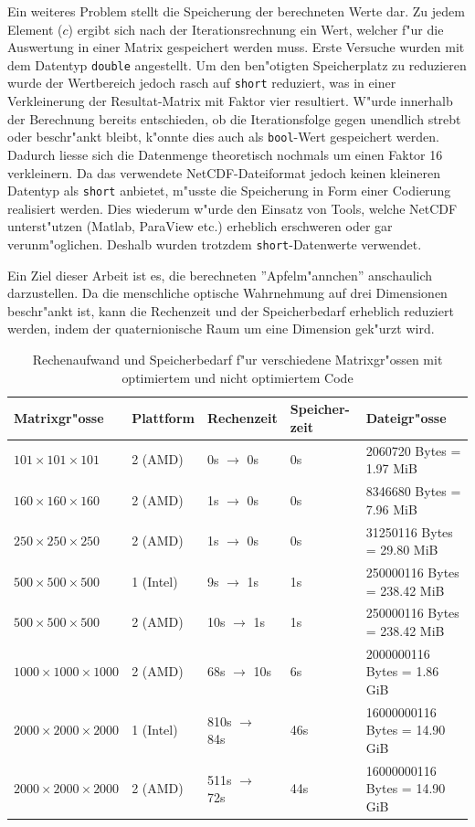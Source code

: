 \begin{refsection}
Ein weiteres Problem stellt die Speicherung der berechneten Werte
dar. Zu jedem Element ($c$) ergibt sich nach der Iterationsrechnung
ein Wert, welcher f"ur die Auswertung in einer Matrix gespeichert
werden muss. Erste Versuche wurden mit dem Datentyp {\tt double}
angestellt. Um den ben"otigten Speicherplatz zu reduzieren wurde
der Wertbereich jedoch rasch auf {\tt short} reduziert, was in einer
Verkleinerung der Resultat-Matrix mit Faktor vier resultiert. W"urde
innerhalb der Berechnung bereits entschieden, ob die Iterationsfolge
gegen unendlich strebt oder beschr"ankt bleibt, k"onnte dies auch als
{\tt bool}-Wert gespeichert werden. Dadurch liesse sich die Datenmenge
theoretisch nochmals um einen Faktor 16 verkleinern. Da das verwendete
NetCDF-Dateiformat jedoch keinen kleineren Datentyp als {\tt short}
anbietet, m"usste die Speicherung in Form einer Codierung realisiert
werden. Dies wiederum w"urde den Einsatz von Tools, welche NetCDF
unterst"utzen (Matlab, ParaView etc.) erheblich erschweren oder gar
verunm"oglichen. Deshalb wurden trotzdem  {\tt short}-Datenwerte
verwendet.

Ein Ziel dieser Arbeit ist es, die berechneten ''Apfelm"annchen''
anschaulich darzustellen. Da die menschliche optische Wahrnehmung auf drei
Dimensionen beschr"ankt ist, kann die Rechenzeit und der Speicherbedarf
erheblich reduziert werden, indem der quaternionische Raum um eine
Dimension gek"urzt wird.

\begin{table}[ht]\centering
	\begin{tabularx}{\textwidth}{|l|l|l|X|l|}
		\hline
		Matrixgr"osse & 	Plattform & Rechenzeit & Speicher-zeit & Dateigr"osse \\ \hline
		$101\times 101\times 101$ & 2 (AMD) & 0s $\to$ 0s  & 0s & 2060720 Bytes = 1.97 MiB \\ \hline
		$160\times 160\times 160$ & 2 (AMD) & 1s $\to$ 0s & 0s & 8346680 Bytes = 7.96 MiB \\ \hline
		$250\times 250\times 250$ & 2 (AMD) & 1s $\to$ 0s & 0s & 31250116 Bytes = 29.80 MiB \\ \hline
		$500\times 500\times 500$ & 1 (Intel) & 9s $\to$ 1s & 1s & 250000116 Bytes = 238.42 MiB \\ \hline
		$500\times 500\times 500$ & 2 (AMD) & 10s $\to$ 1s & 1s & 250000116 Bytes = 238.42 MiB \\ \hline
		$1000\times 1000\times 1000$ & 2 (AMD) & 68s $\to$ 10s & 6s & 2000000116 Bytes = 1.86 GiB \\ \hline
		$2000\times 2000\times 2000$ & 1 (Intel) & 810s $\to$ 84s & 46s & 16000000116 Bytes = 14.90 GiB \\ \hline
		$2000\times 2000\times 2000$ & 2 (AMD) & 511s $\to$ 72s & 44s & 16000000116 Bytes = 14.90 GiB \\ \hline
	\end{tabularx}
	\caption{Rechenaufwand und Speicherbedarf f"ur verschiedene Matrixgr"ossen mit optimiertem und nicht optimiertem Code}
	\label{aufwandstatistik}
\end{table}


\end{refsection}
